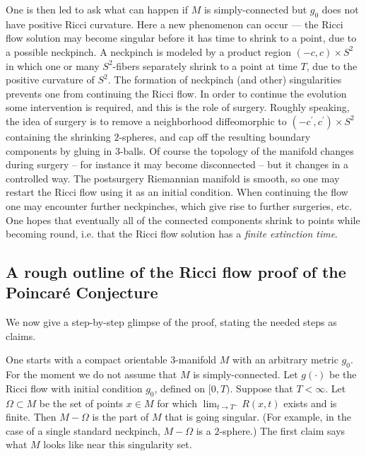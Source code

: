 \documentclass[12pt]{amsart}
\numberwithin{equation}{section}
\theoremstyle{plain}
\theoremstyle{definition}
\theoremstyle{remark}
\begin{document}
One is then led to ask what can happen if $M$ is simply-connected
but $g_0$ does not have positive Ricci curvature.  Here a new 
phenomenon can occur --- the Ricci flow solution may become singular
before it has time to shrink to a point, due to a possible neckpinch. 
A neckpinch is modeled by a product region $(- c, c) \times S^2$ in which
one or many $S^2$-fibers separately shrink to a point at time $T$, due to the
positive curvature of $S^2$.   The formation of  neckpinch (and other)
singularities prevents one from continuing the Ricci flow.  
In order to continue the evolution some intervention is required, and this
is the role of surgery.  Roughly speaking, the
idea of surgery is to remove a neighborhood diffeomorphic to 
$(- c^\prime, c^\prime) \times S^2$ containing the shrinking $2$-spheres,
and cap off the resulting boundary components by 
gluing in $3$-balls.   Of course the
topology of the manifold changes during surgery -- for instance it may become
disconnected -- but it changes in a controlled way. 
The postsurgery Riemannian manifold is smooth,
so one may  restart the Ricci flow using 
it as an initial condition.  
When continuing the flow one may encounter further neckpinches,
which give rise to further surgeries, etc.
One hopes that
eventually all of the connected components
shrink to points while becoming round, i.e. that the Ricci flow solution 
has a {\em finite extinction time}.


\subsection{A rough outline of the Ricci flow proof of the Poincar\'e
Conjecture}
We now give a step-by-step glimpse of the proof, 
stating the needed steps as claims.

One starts with a compact orientable $3$-manifold $M$ with an 
arbitrary metric $g_0$. For the moment we do not assume that
$M$ is simply-connected. Let $g(\cdot)$ be the Ricci flow
with initial condition $g_0$, defined on $[0,T)$.
Suppose that $T <\infty$.   Let $\Omega \subset M$ be 
the set of points $x \in M$ for which  
$\lim_{t \rightarrow T^-} R(x,t) $ exists 
and is finite.
Then $M - \Omega$ is the part of $M$ that is going singular.
(For example, in the case of a single standard neckpinch, $M - \Omega$
is a $2$-sphere.) The first claim says what $M$ looks like
near this singularity set.
\end{document}
